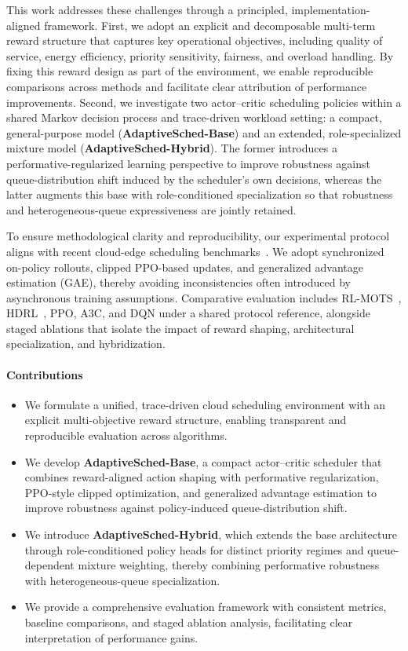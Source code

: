 \documentclass[journal]{IEEEtran}
\begin{document}
This work addresses these challenges through a principled, implementation-aligned framework. First, we adopt an explicit and decomposable multi-term reward structure that captures key operational objectives, including quality of service, energy efficiency, priority sensitivity, fairness, and overload handling. By fixing this reward design as part of the environment, we enable reproducible comparisons across methods and facilitate clear attribution of performance improvements. Second, we investigate two actor--critic scheduling policies within a shared Markov decision process and trace-driven workload setting: a compact, general-purpose model (\textbf{AdaptiveSched-Base}) and an extended, role-specialized mixture model (\textbf{AdaptiveSched-Hybrid}). The former introduces a performative-regularized learning perspective to improve robustness against queue-distribution shift induced by the scheduler’s own decisions, whereas the latter augments this base with role-conditioned specialization so that robustness and heterogeneous-queue expressiveness are jointly retained.

To ensure methodological clarity and reproducibility, our experimental protocol aligns with recent cloud-edge scheduling benchmarks~\cite{zhang2025s41598}. We adopt synchronized on-policy rollouts, clipped PPO-based updates, and generalized advantage estimation (GAE), thereby avoiding inconsistencies often introduced by asynchronous training assumptions. Comparative evaluation includes RL-MOTS~\cite{zhang2025s41598}, HDRL~\cite{zhang2024hdrl}, PPO, A3C, and DQN under a shared protocol reference, alongside staged ablations that isolate the impact of reward shaping, architectural specialization, and hybridization.

\paragraph{Contributions}
\begin{itemize}
  \item We formulate a unified, trace-driven cloud scheduling environment with an explicit multi-objective reward structure, enabling transparent and reproducible evaluation across algorithms.
  \item We develop \textbf{AdaptiveSched-Base}, a compact actor--critic scheduler that combines reward-aligned action shaping with performative regularization, PPO-style clipped optimization, and generalized advantage estimation to improve robustness against policy-induced queue-distribution shift.
  \item We introduce \textbf{AdaptiveSched-Hybrid}, which extends the base architecture through role-conditioned policy heads for distinct priority regimes and queue-dependent mixture weighting, thereby combining performative robustness with heterogeneous-queue specialization.
  \item We provide a comprehensive evaluation framework with consistent metrics, baseline comparisons, and staged ablation analysis, facilitating clear interpretation of performance gains.
\end{itemize}
\end{document}
